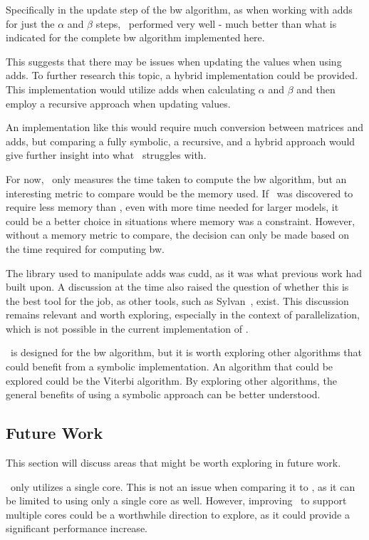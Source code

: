 Specifically in the update step of the \gls{bw} algorithm, as when working with \glspl{add} for just the $\alpha$ and $\beta$ steps, \Cupaal\ performed very well - much better than what is indicated for the complete \gls{bw} algorithm implemented here.

This suggests that there may be issues when updating the values when using \glspl{add}.
To further research this topic, a hybrid implementation could be provided.
This implementation would utilize \glspl{add} when calculating $\alpha$ and $\beta$ and then employ a recursive approach when updating values.

An implementation like this would require much conversion between matrices and \glspl{add}, but comparing a fully symbolic, a recursive, and a hybrid approach would give further insight into what \Cupaal\ struggles with.

For now, \Cupaal\ only measures the time taken to compute the \gls{bw} algorithm, but an interesting metric to compare would be the memory used.
If \Cupaal\ was discovered to require less memory than \Jajapy, even with more time needed for larger models, it could be a better choice in situations where memory was a constraint.
However, without a memory metric to compare, the decision can only be made based on the time required for computing \gls{bw}.

The library used to manipulate \glspl{add} was \gls{cudd}, as it was what previous work had built upon.
A discussion at the time also raised the question of whether this is the best tool for the job, as other tools, such as Sylvan~\cite{van2017sylvan}, exist.
This discussion remains relevant and worth exploring, especially in the context of parallelization, which is not possible in the current implementation of \Cupaal.

\Cupaal\ is designed for the \gls{bw} algorithm, but it is worth exploring other algorithms that could benefit from a symbolic implementation.
An algorithm that could be explored could be the Viterbi algorithm.
By exploring other algorithms, the general benefits of using a symbolic approach can be better understood.


\subsection{Future Work}\label{subsec:future_work}
This section will discuss areas that might be worth exploring in future work.

\Cupaal\ only utilizes a single core. This is not an issue when comparing it to \Jajapy, as it can be limited to using only a single core as well.
However, improving \Cupaal\ to support multiple cores could be a worthwhile direction to explore, as it could provide a significant performance increase.

